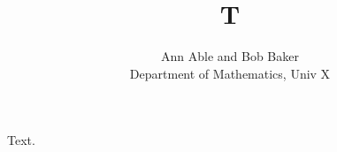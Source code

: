 \documentclass{article}
\begin{document}
\title{T}
\author{Ann Able and Bob Baker\\ Department of Mathematics, Univ X}
\maketitle
Text.
\end{document}
